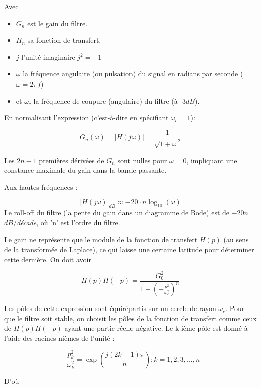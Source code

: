 \documentclass[conference,onecolumn]{IEEEtran}
\begin{document}
Avec
\begin{itemize}
    \item[] $G_n$ est le gain du filtre.
    \item[] $H_n$ sa fonction de transfert.
    \item[] $j$ l'unité imaginaire $j^2 = -1$
    \item[] $\omega$ la fréquence angulaire (ou pulsation) du signal en radians par seconde ($\omega = 2\pi f$)
    \item[] et $\omega_c$ la fréquence de coupure (angulaire) du filtre (à -$3dB$).
\end{itemize}
En normalisant l'expression (c’est-à-dire en spécifiant $\omega_c = 1$):

\begin{equation}
    G_n(\omega) = |H(j\omega)| = \frac{1}{\sqrt{1 + \omega}^2}
\end{equation}

Les $2n-1$ premières dérivées de $G_n$ sont nulles pour $\omega = 0$, impliquant une constance maximale du gain dans la bande passante.

Aux hautes fréquences :

\begin{equation}
    |H(j\omega)|_{dB} \approx -20 \cdot n\log_{10}(\omega)
\end{equation}
Le roll-off du filtre (la pente du gain dans un diagramme de Bode) est de $-20n$ $dB/$\textit{décade}, où 'n' est l'ordre du filtre.

Le gain ne représente que le module de la fonction de transfert $H(p)$ (au sens de la transformée de Laplace), ce qui laisse une certaine latitude pour déterminer cette dernière. On doit avoir

\begin{equation}
    H(p)H(-p) = \frac{G_0^2}{1 + (-\frac{p^2}{\omega_c^2})^n}
\end{equation}

Les pôles de cette expression sont équirépartis sur un cercle de rayon  $\omega_c$. Pour que le filtre soit stable, on choisit les pôles de la fonction de transfert comme ceux de $H(p)H(-p)$ ayant une partie réelle négative. Le k-ième pôle est donné à l'aide des racines nièmes de l'unité :

\begin{equation}
    -\frac{p_k^2}{\omega_k^2} = \exp({\frac{j(2k - 1)\pi}{n}}); k = 1,2,3, ...,n
\end{equation}
    

D’où
\end{document}
